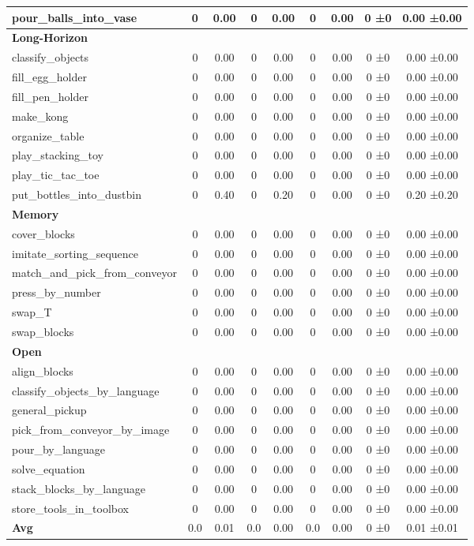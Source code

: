 \begin{table}[H]
{\begin{tabular}{l|c|c|c|c|c|c|c|c}
pour\_balls\_into\_vase & 0 & 0.00 & 0 & 0.00 & 0 & 0.00 & 0 ±0 & 0.00 ±0.00 \\
\hline
\multicolumn{9}{l}{\textbf{Long-Horizon}} \\
classify\_objects & 0 & 0.00 & 0 & 0.00 & 0 & 0.00 & 0 ±0 & 0.00 ±0.00 \\
fill\_egg\_holder & 0 & 0.00 & 0 & 0.00 & 0 & 0.00 & 0 ±0 & 0.00 ±0.00 \\
fill\_pen\_holder & 0 & 0.00 & 0 & 0.00 & 0 & 0.00 & 0 ±0 & 0.00 ±0.00 \\
make\_kong & 0 & 0.00 & 0 & 0.00 & 0 & 0.00 & 0 ±0 & 0.00 ±0.00 \\
organize\_table & 0 & 0.00 & 0 & 0.00 & 0 & 0.00 & 0 ±0 & 0.00 ±0.00 \\
play\_stacking\_toy & 0 & 0.00 & 0 & 0.00 & 0 & 0.00 & 0 ±0 & 0.00 ±0.00 \\
play\_tic\_tac\_toe & 0 & 0.00 & 0 & 0.00 & 0 & 0.00 & 0 ±0 & 0.00 ±0.00 \\
put\_bottles\_into\_dustbin & 0 & 0.40 & 0 & 0.20 & 0 & 0.00 & 0 ±0 & 0.20 ±0.20 \\
\hline
\multicolumn{9}{l}{\textbf{Memory}} \\
cover\_blocks & 0 & 0.00 & 0 & 0.00 & 0 & 0.00 & 0 ±0 & 0.00 ±0.00 \\
imitate\_sorting\_sequence & 0 & 0.00 & 0 & 0.00 & 0 & 0.00 & 0 ±0 & 0.00 ±0.00 \\
match\_and\_pick\_from\_conveyor & 0 & 0.00 & 0 & 0.00 & 0 & 0.00 & 0 ±0 & 0.00 ±0.00 \\
press\_by\_number & 0 & 0.00 & 0 & 0.00 & 0 & 0.00 & 0 ±0 & 0.00 ±0.00 \\
swap\_T & 0 & 0.00 & 0 & 0.00 & 0 & 0.00 & 0 ±0 & 0.00 ±0.00 \\
swap\_blocks & 0 & 0.00 & 0 & 0.00 & 0 & 0.00 & 0 ±0 & 0.00 ±0.00 \\
\hline
\multicolumn{9}{l}{\textbf{Open}} \\
align\_blocks & 0 & 0.00 & 0 & 0.00 & 0 & 0.00 & 0 ±0 & 0.00 ±0.00 \\
classify\_objects\_by\_language & 0 & 0.00 & 0 & 0.00 & 0 & 0.00 & 0 ±0 & 0.00 ±0.00 \\
general\_pickup & 0 & 0.00 & 0 & 0.00 & 0 & 0.00 & 0 ±0 & 0.00 ±0.00 \\
pick\_from\_conveyor\_by\_image & 0 & 0.00 & 0 & 0.00 & 0 & 0.00 & 0 ±0 & 0.00 ±0.00 \\
pour\_by\_language & 0 & 0.00 & 0 & 0.00 & 0 & 0.00 & 0 ±0 & 0.00 ±0.00 \\
solve\_equation & 0 & 0.00 & 0 & 0.00 & 0 & 0.00 & 0 ±0 & 0.00 ±0.00 \\
stack\_blocks\_by\_language & 0 & 0.00 & 0 & 0.00 & 0 & 0.00 & 0 ±0 & 0.00 ±0.00 \\
store\_tools\_in\_toolbox & 0 & 0.00 & 0 & 0.00 & 0 & 0.00 & 0 ±0 & 0.00 ±0.00 \\
\hline
\textbf{Avg} & 0.0 & 0.01 & 0.0 & 0.00 & 0.0 & 0.00 & 0 ±0 & 0.01 ±0.01 \\
\hline
\end{tabular}
}
\end{table}
